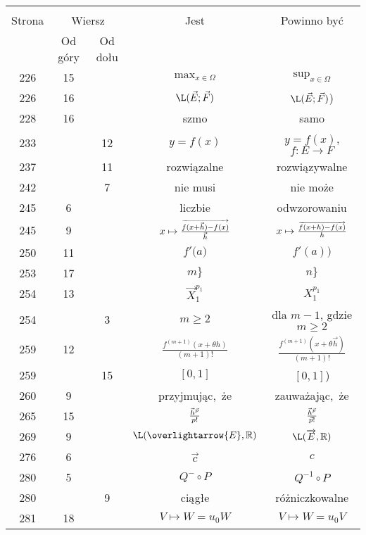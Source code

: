 \documentclass[a4paper,11pt]{article}
\newcommand{\ra}{\rightarrow}
\newcommand{\ora}{\overrightarrow}
\newcommand{\ola}{\overlightarrow}
\begin{document}
\begin{center}
  \begin{tabular}{|c|c|c|c|c|}
    \hline
    & \multicolumn{2}{c|}{} & & \\
    Strona & \multicolumn{2}{c|}{Wiersz}& Jest & Powinno być \\ \cline{2-3}
    & Od góry & Od dołu &  &  \\ \hline
    226 & 15 & & $\mathrm{max}_{ x \in \Omega }$ & $\sup_{ x \in \Omega }$ \\
    226 & 16 & & $\L( \vec{ E }; \vec{ F } )$
           & $\L( \vec{ E }; \vec{ F } )$) \\
    228 & 16 & & szmo & samo \\
    233 & & 12 & $y = f( x )$ & $y = f( x )$, $f : E \ra F$ \\
    237 & & 11 & rozwiązalne & rozwiązywalne \\
    242 & &  7 & nie musi & nie może \\
    245 &  6 & & liczbie & odwzorowaniu \\
    245 &  9 & & $x \mapsto \fr{ \ora{ f( x + \vec{ h } ) - f( x ) } }
                 { \vec{ h } }$
           & $x \mapsto \fr{ \ora{ f( x + h ) - f( x ) } }{ h }$ \\
    250 & 11 & & $f'( a \Big)$ & $f'( a ) \Big)$ \\
    253 & 17 & & $m \}$ & $n \}$ \\
    254 & 13 & & $\vec{ X }^{ p_{ 1 } }_{ 1 }$ & $X^{ p_{ 1 } }_{ 1 }$ \\
    254 & &  3 & $m \geq 2$ & dla $m - 1$, gdzie $m \geq 2$ \\
    259 & 12 & & $\frac{ f^{ ( m + 1 ) }( x + \theta h ) }{ ( m + 1 )! }$
           & $\frac{ f^{ ( m + 1 ) }( x + \theta \vec{ h } ) }
             { ( m + 1 )! }$ \\
    259 & & 15 & $[ 0, 1 ]$ & $[ 0, 1 ]$) \\
    260 &  9 & & przyjmując,~że & zauważając,~że \\
    265 & 15 & & $\frac{ \vec{ h }^{ \vec{ p } } }{ p! }$
           & $\frac{ \vec{ h }^{ \vec{ p } } }{ \vec{ p }! }$ \\
    269 &  9 & & $\L( \ola{ E }, \R )$
           & $\L( \ora{ E }, \R )$ \\
    276 &  6 & & $\vec{ c }$ & $c$ \\
    280 &  5 & & $Q^{ - } \circ P$ & $Q^{ -1 } \circ P$ \\
    280 & &  9 & ciągłe & różniczkowalne \\
    281 & 18 & & $V \mapsto W = u_{ 0 } W$ & $V \mapsto W = u_{ 0 } V$ \\

\end{tabular}
\end{center}
\end{document}
